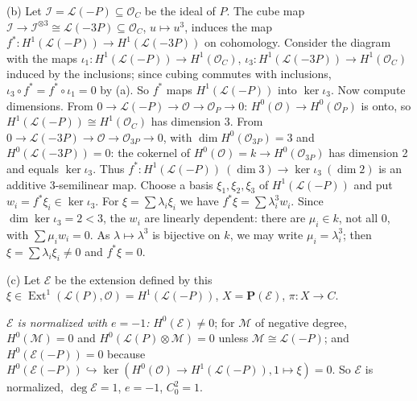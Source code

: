 \documentclass[11pt]{article}
\begin{document}
(b) Let $\mathcal I=\mathcal L(-P)\subseteq\mathcal O_C$ be the ideal of $P$. The cube map $\mathcal I\to\mathcal I^{\otimes3}\cong\mathcal L(-3P)\subseteq\mathcal O_C$, $u\mapsto u^3$, induces the map $f^*\colon H^1(\mathcal L(-P))\to H^1(\mathcal L(-3P))$ on cohomology. Consider the diagram with the maps $\iota_1\colon H^1(\mathcal L(-P))\to H^1(\mathcal O_C)$, $\iota_3\colon H^1(\mathcal L(-3P))\to H^1(\mathcal O_C)$ induced by the inclusions; since cubing commutes with inclusions, $\iota_3\circ f^*=f^*\circ\iota_1=0$ by (a). So $f^*$ maps $H^1(\mathcal L(-P))$ into $\ker\iota_3$. Now compute dimensions. From $0\to\mathcal L(-P)\to\mathcal O\to\mathcal O_P\to0$: $H^0(\mathcal O)\to H^0(\mathcal O_P)$ is onto, so $H^1(\mathcal L(-P))\cong H^1(\mathcal O_C)$ has dimension 3. From $0\to\mathcal L(-3P)\to\mathcal O\to\mathcal O_{3P}\to0$, with $\dim H^0(\mathcal O_{3P})=3$ and $H^0(\mathcal L(-3P))=0$: the cokernel of $H^0(\mathcal O)=k\to H^0(\mathcal O_{3P})$ has dimension 2 and equals $\ker\iota_3$. Thus $f^*\colon H^1(\mathcal L(-P))\ (\dim3)\to\ker\iota_3\ (\dim2)$ is an additive $3$-semilinear map. Choose a basis $\xi_1,\xi_2,\xi_3$ of $H^1(\mathcal L(-P))$ and put $w_i=f^*\xi_i\in\ker\iota_3$. For $\xi=\sum\lambda_i\xi_i$ we have $f^*\xi=\sum\lambda_i^3w_i$. Since $\dim\ker\iota_3=2<3$, the $w_i$ are linearly dependent: there are $\mu_i\in k$, not all 0, with $\sum\mu_iw_i=0$. As $\lambda\mapsto\lambda^3$ is bijective on $k$, we may write $\mu_i=\lambda_i^3$; then $\xi=\sum\lambda_i\xi_i\ne0$ and $f^*\xi=0$.

(c) Let $\mathcal E$ be the extension defined by this $\xi\in\operatorname{Ext}^1(\mathcal L(P),\mathcal O)=H^1(\mathcal L(-P))$, $X=\mathbf P(\mathcal E)$, $\pi\colon X\to C$.

\emph{$\mathcal E$ is normalized with $e=-1$:} $H^0(\mathcal E)\ne0$; for $\mathcal M$ of negative degree, $H^0(\mathcal M)=0$ and $H^0(\mathcal L(P)\otimes\mathcal M)=0$ unless $\mathcal M\cong\mathcal L(-P)$; and $H^0(\mathcal E(-P))=0$ because $H^0(\mathcal E(-P))\hookrightarrow\ker(H^0(\mathcal O)\to H^1(\mathcal L(-P)),1\mapsto\xi)=0$. So $\mathcal E$ is normalized, $\deg\mathcal E=1$, $e=-1$, $C_0^2=1$.
\end{document}
